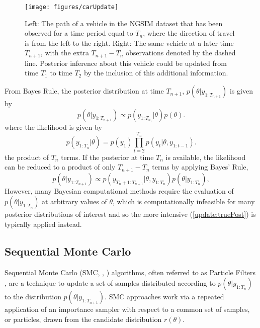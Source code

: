 \documentclass[
12pt, %
onehalfspacing, %
nohyperref, %
headsepline, %
chapterinoneline, %
]{MastersDoctoralThesis} %
\begin{document}
\begin{figure}[htbp]
\centering
\texttt{[image: figures/carUpdate]}
\caption{Left: The path of a vehicle in the NGSIM dataset that has been observed for a time period equal to $T_{n}$, where the direction of travel is from the left to the right. Right: The same vehicle at a later time $T_{n+1}$, with the extra $T_{n+1} - T_{n}$ observations denoted by the dashed line. Posterior inference about this vehicle could be updated from time $T_{1}$ to time $T_{2}$ by the inclusion of this additional information.}
\label{fig:updatetimeUpdate}
\end{figure}

From Bayes Rule, the posterior distribution at time $T_{n+1}$, $p(\theta | y_{1:T_{n+1}})$ is given by
\begin{equation}
\label{update:truePost}
p(\theta | y_{1:T_{n+1}}) \propto p(y_{1:T_{n_1}} | \theta)p(\theta).
\end{equation}
where the likelihood is given by
\begin{equation}
\label{update:likelihood}
p(y_{1:T_n} | \theta) = p(y_1) \prod_{t=2}^{T_n} p(y_t | \theta, y_{1:t-1}).
\end{equation}
the product of $T_n$ terms. If the posterior at time $T_{n}$ is available, the likelihood can be reduced to a product of only $T_{n+1} - T_{n}$ terms by applying Bayes' Rule,
\begin{equation}
\label{update:updatePost}
p(\theta | y_{1:T_{n+1}}) \propto p(y_{T_{n}+1:T_{n+1}} | \theta, y_{1:T_{n}})p(\theta | y_{1:T_{n}}),
\end{equation}
However, many Bayesian computational methods require the evaluation of $p(\theta | y_{1:T_{n}})$ at arbitrary values of $\theta$, which is computationally infeasible for many posterior distributions of interest and so the more intensive (\ref{update:truePost}) is typically applied instead.

\subsection{Sequential Monte Carlo}
\label{subsec:SMC}

Sequential Monte Carlo (SMC, \cite{Doucet2000}, \cite{Arulampalam2002}) algorithms, often referred to as Particle Filters , are a technique to update a set of samples distributed according to $p(\theta | y_{1:T_n})$ to the distribution $p(\theta | y_{1:T_{n+1}})$. SMC approaches work via a repeated application of an importance sampler with respect to a common set of samples, or particles, drawn from the candidate distribution $r(\theta)$.
\\
\end{document}
